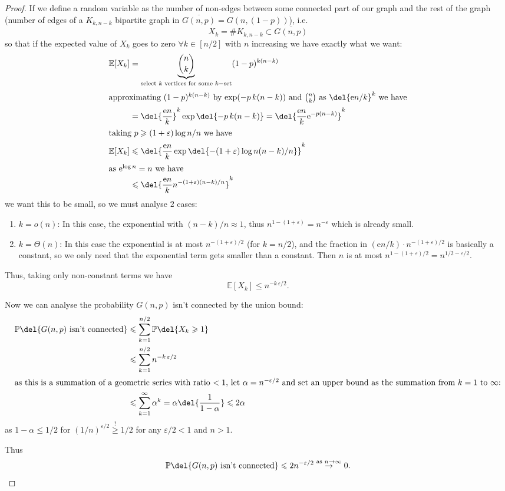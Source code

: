 \documentclass[english, dark, index]{Iart}
\begin{document}
	\begin{proof}
		If we define a random variable as the number of non-edges between some connected part of our graph and the rest of the graph (number of edges of a $ K_{k,n-k} $ bipartite graph in $ \overline{G(n,p)}=G(n,(1-p)) $), i.e.
		\[ X_k=\# K_{k,n-k}\subset \overline{G(n,p)} \]
		so that if the expected value of $ X_k $ goes to zero $ \forall k\in[n/2] $ with $ n $ increasing we have exactly what we want:
		\begin{align*}
			\mathbb{E}[X_k]&=\underbrace{\binom{n}{k}}_{\text{select $ k $ vertices for some $ k- $set}}(1-p)^{k(n-k)}\\
			\intertext{approximating $ (1-p)^{k(n-k)} $ by $ \exp(-p\,k(n-k)) $ and $ \binom{n}{k} $ as $ \del{\mathrm{e}n/k}^{k} $ we have}
			&=\del{\dfrac{\mathrm{e}n}{k}}^{k}\exp\del{-p\,k(n-k)}=\del{\dfrac{\mathrm{e}n}{k}\mathrm{e}^{-p(n-k)}}^{k}\\
			\intertext{taking $ p\geqslant (1+\varepsilon)\log n/n $ we have}
			\mathbb{E}[X_k]&\leqslant\del{\dfrac{\mathrm{e}n}{k}\exp\del{-(1+\varepsilon)\log n(n-k)/n}}^{k}\\
			\intertext{as $ \mathrm{e}^{\log n}=n $ we have}
			&\leqslant\del{\dfrac{\mathrm{e}n}{k}n^{-(1+\varepsilon)(n-k)/n}}^{k}
		\end{align*}
		we want this to be small, so we must analyse $ 2 $ cases:
		\begin{enumerate}
			\item $ k=o(n) $:
			In this case, the exponential with $ (n-k)/n\approx 1 $, thus $ n^{1-(1+\varepsilon)}=n^{-\varepsilon} $ which is already small.
			\item $ k=\Theta(n) $:
			In this case the exponential is at most $ n^{-(1+\varepsilon)/2} $ (for $ k=n/2 $), and the fraction in $ (\mathrm{e}n/k)\cdot n^{-(1+\varepsilon)/2} $ is basically a constant, so we only need that the exponential term gets smaller than a constant. Then $ n $ is at most $ n^{1-(1+\varepsilon)/2}=n^{1/2-\varepsilon/2} $.
		\end{enumerate}
		Thus, taking only non-constant terms we have
		\[ \mathbb{E}[X_k]\leqslant n^{-k\,\varepsilon/2}. \]
		
		Now we can analyse the probability $ G(n,p) $ isn't connected by the union bound:
		\begin{align*}
			\mathbb{P}\del{G(n,p)\textup{ isn't connected}}&\leqslant\sum_{k=1}^{n/2}\mathbb{P}\del{X_k\geqslant1}\\
			&\leqslant\sum_{k=1}^{n/2}n^{-k\,\varepsilon/2}\\
			\intertext{as this is a summation of a geometric series with ratio $ <1 $, let $ \alpha=n^{-\varepsilon/2} $ and set an upper bound as the summation from $ k=1 $ to $ \infty $:}
			&\leqslant\sum_{k=1}^{\infty}\alpha^{k}=\alpha\del{\dfrac{1}{1-\alpha}}\leqslant 2\alpha
		\end{align*}
		as $ 1-\alpha\leqslant 1/2 $ for $ (1/n)^{\varepsilon/2}\overset{!}{\geqslant} 1/2 $ for any $ \varepsilon/2<1 $ and $ n>1 $.
		
		Thus
		\[ \mathbb{P}\del{G(n,p)\textup{ isn't connected}}\leqslant 2n^{-\varepsilon/2}\overset{\textup{as }n\to\infty}{\to} 0. \]
	\end{proof}
\end{document}
